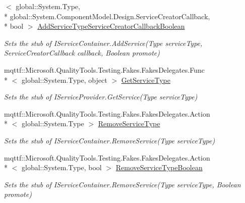 \begin{DoxyCompactItemize}
$<$ global\-::\-System.\-Type, \\*
global\-::\-System.\-Component\-Model.\-Design.\-Service\-Creator\-Callback, \\*
bool $>$ \hyperlink{class_system_1_1_component_model_1_1_design_1_1_fakes_1_1_stub_i_service_container_a045a334be60d4794d4b49b03b3d5e82f}{Add\-Service\-Type\-Service\-Creator\-Callback\-Boolean}
\begin{DoxyCompactList}\small\item\em Sets the stub of I\-Service\-Container.\-Add\-Service(\-Type service\-Type, Service\-Creator\-Callback callback, Boolean promote)\end{DoxyCompactList}\item 
mqttf\-::\-Microsoft.\-Quality\-Tools.\-Testing.\-Fakes.\-Fakes\-Delegates.\-Func\\*
$<$ global\-::\-System.\-Type, object $>$ \hyperlink{class_system_1_1_component_model_1_1_design_1_1_fakes_1_1_stub_i_service_container_a72f04cbe9215a01e9e8874750e95d0c1}{Get\-Service\-Type}
\begin{DoxyCompactList}\small\item\em Sets the stub of I\-Service\-Provider.\-Get\-Service(\-Type service\-Type)\end{DoxyCompactList}\item 
mqttf\-::\-Microsoft.\-Quality\-Tools.\-Testing.\-Fakes.\-Fakes\-Delegates.\-Action\\*
$<$ global\-::\-System.\-Type $>$ \hyperlink{class_system_1_1_component_model_1_1_design_1_1_fakes_1_1_stub_i_service_container_ac23245425838ba2edde3846a732a52f0}{Remove\-Service\-Type}
\begin{DoxyCompactList}\small\item\em Sets the stub of I\-Service\-Container.\-Remove\-Service(\-Type service\-Type)\end{DoxyCompactList}\item 
mqttf\-::\-Microsoft.\-Quality\-Tools.\-Testing.\-Fakes.\-Fakes\-Delegates.\-Action\\*
$<$ global\-::\-System.\-Type, bool $>$ \hyperlink{class_system_1_1_component_model_1_1_design_1_1_fakes_1_1_stub_i_service_container_a76c5caefae87400a21a807b548e6f646}{Remove\-Service\-Type\-Boolean}
\begin{DoxyCompactList}\small\item\em Sets the stub of I\-Service\-Container.\-Remove\-Service(\-Type service\-Type, Boolean promote)\end{DoxyCompactList}\end{DoxyCompactItemize}


